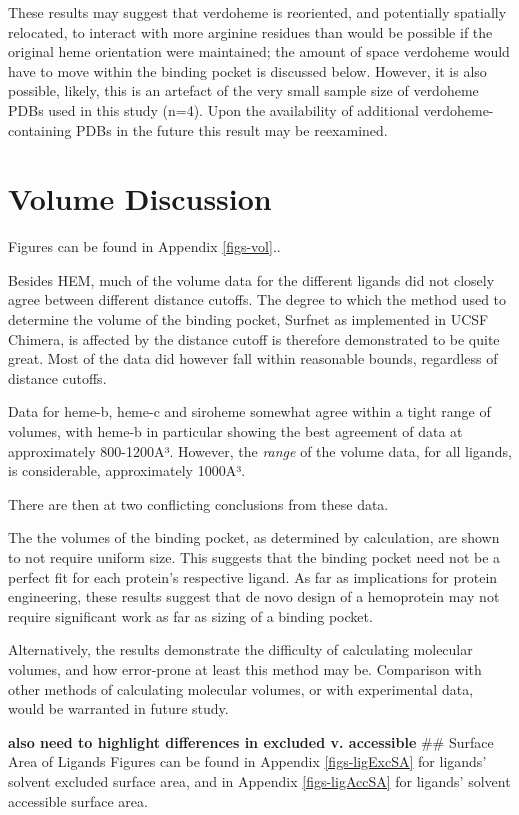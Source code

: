 \documentclass[a4paper, nobind]{templates/ociamthesis}
\begin{document}
These results may suggest that verdoheme is reoriented, and potentially spatially relocated, to interact with more arginine residues than would be possible if the original heme orientation were maintained; the amount of space verdoheme would have to move within the binding pocket is discussed below. However, it is also possible, likely, this is an artefact of the very small sample size of verdoheme PDBs used in this study (n=4). Upon the availability of additional verdoheme-containing PDBs in the future this result may be reexamined.

\hypertarget{volume-discussion}{%
\section{Volume Discussion}\label{volume-discussion}}

Figures can be found in Appendix \ref{figs-vol}..

Besides HEM, much of the volume data for the different ligands did not closely agree between different distance cutoffs. The degree to which the method used to determine the volume of the binding pocket, Surfnet as implemented in UCSF Chimera, is affected by the distance cutoff is therefore demonstrated to be quite great. Most of the data did however fall within reasonable bounds, regardless of distance cutoffs.

Data for heme-b, heme-c and siroheme somewhat agree within a tight range of volumes, with heme-b in particular showing the best agreement of data at approximately 800-1200A³. However, the \emph{range} of the volume data, for all ligands, is considerable, approximately 1000A³.

There are then at two conflicting conclusions from these data.

The the volumes of the binding pocket, as determined by calculation, are shown to not require uniform size. This suggests that the binding pocket need not be a perfect fit for each protein's respective ligand. As far as implications for protein engineering, these results suggest that de novo design of a hemoprotein may not require significant work as far as sizing of a binding pocket.

Alternatively, the results demonstrate the difficulty of calculating molecular volumes, and how error-prone at least this method may be. Comparison with other methods of calculating molecular volumes, or with experimental data, would be warranted in future study.

\textbf{also need to highlight differences in excluded v. accessible}
\#\# Surface Area of Ligands
Figures can be found in Appendix \ref{figs-ligExcSA} for ligands' solvent excluded surface area, and
in Appendix \ref{figs-ligAccSA} for ligands' solvent accessible surface area.
\end{document}
